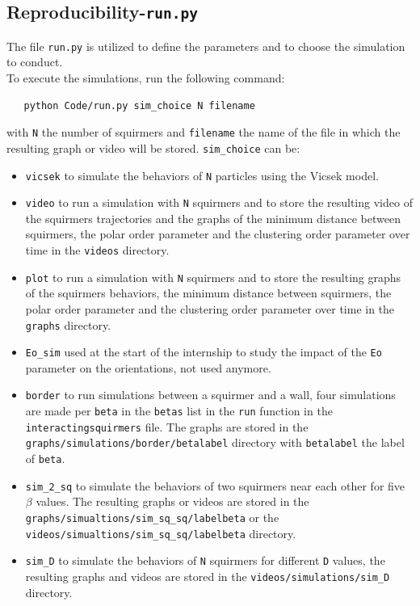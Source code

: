 \documentclass{article}
\begin{document}
\subsection*{Reproducibility-\texttt{run.py}}
The file \texttt{run.py} is utilized to define the parameters and to choose the simulation to conduct.\\
 To execute the simulations, run the following command:
 \begin{verbatim}
   python Code/run.py sim_choice N filename
\end{verbatim} 
with \texttt{N} the number of squirmers and \texttt{filename} the name of the file in which the resulting graph or video will be stored.
\texttt{sim\_choice} can be:
\begin{itemize}
   \item \texttt{vicsek} to simulate the behaviors of \texttt{N} particles using the Vicsek model.
   \item \texttt{video} to run a simulation with \texttt{N} squirmers and to store the resulting video of the squirmers trajectories and the graphs of the 
   minimum distance between squirmers, the polar order parameter and the clustering order parameter over time
    in the \texttt{videos} directory.
   \item \texttt{plot} to run a simulation with \texttt{N} squirmers and to store the resulting graphs of the squirmers behaviors, the
   minimum distance between squirmers, the polar order parameter and the clustering order parameter over time
    in the \texttt{graphs} directory.
   \item \texttt{Eo\_sim} used at the start of the internship to study the impact of the \texttt{Eo} parameter on the orientations,
   not used anymore.
   \item \texttt{border} to run simulations between a squirmer and a wall, four simulations are made per \texttt{beta} in the \texttt{betas}
   list in the \texttt{run} function in the \texttt{interactingsquirmers} file. The graphs are stored in the \\
   \texttt{graphs/simulations/border/betalabel}
   directory with \texttt{betalabel} the label of \texttt{beta}.
   \item \texttt{sim\_2\_sq} to simulate the behaviors of two squirmers near each other for five $\beta$ values. The
   resulting graphs or videos are stored in the \\
   \texttt{graphs/simualtions/sim\_sq\_sq/labelbeta} or the \\
   \texttt{videos/simualtions/sim\_sq\_sq/labelbeta}
   directory.
   \item \texttt{sim\_D} to simulate the behaviors of \texttt{N} squirmers for different \texttt{D} values, the resulting graphs
   and videos are stored in the \texttt{videos/simulations/sim\_D} directory.
\end{itemize}
\end{document}

